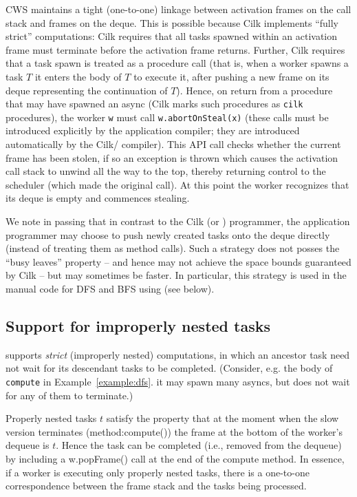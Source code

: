 CWS maintains a tight (one-to-one) linkage between activation frames
on the call stack and frames on the deque. This is possible because
Cilk implements ``fully strict'' computations: Cilk requires that all
tasks spawned within an activation frame must terminate before the
activation frame returns. Further, Cilk requires that a task spawn is
treated as a procedure call (that is, when a worker spawns a task $T$ it
enters the body of $T$ to execute it, after pushing a new frame on
its deque representing the continuation of $T$). Hence, on
return from a procedure that may have spawned an async (Cilk marks
such procedures as {\tt cilk} procedures), the worker {\tt w} must
call {\tt w.abortOnSteal(x)} (these calls must be introduced
explicitly by the application compiler; they are introduced
automatically by the Cilk/\Xten{} compiler). This API call checks
whether the current frame has been stolen, if so an exception is
thrown which causes the activation call stack to unwind all the way to
the top, thereby returning control to the scheduler (which made the
original call). At this point the worker recognizes that its deque is
empty and commences stealing.

We note in passing that in contrast to the Cilk (or \Xten{}) programmer,
the \XWS{} application programmer may choose to push newly created
tasks onto the deque directly (instead of treating them as method
calls). Such a strategy does not posses the ``busy leaves'' property
\cite{cilk} -- and hence may not achieve the space bounds guaranteed
by Cilk -- but may sometimes be faster. In particular, this strategy
is used in the manual code for DFS and BFS using \XWS{} (see below).


\subsection{Support for improperly nested tasks}
\XWS{} supports {\em strict} ({improperly nested}) computations, in
which an ancestor task need not wait for its descendant tasks to be
completed.  (Consider, e.g.{} the body of {\tt compute} in
Example~\ref{example:dfs}.  it may spawn many asyncs, but does not
wait for any of them to terminate.)

Properly nested tasks $t$ satisfy the property that at the moment when
the slow version terminates (method:{\java compute()}) the frame at
the bottom of the worker's dequeue is $t$. Hence the task can be
completed (i.e., removed from the dequeue) by including a {\java
w.popFrame()} call at the end of the compute method. In essence, if a
worker is executing only properly nested tasks, there is a one-to-one
correspondence between the frame stack and the tasks being processed.

